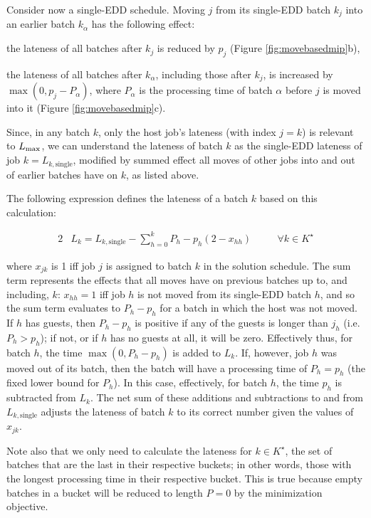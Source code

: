 \documentclass[13pt, letterpaper, oneside]{book}
\begin{document}


Consider now a single-EDD schedule. Moving $j$ from its single-EDD batch $k_j$ into an earlier
batch $k_\alpha$ has the following effect:
\begin{alist}
\item{the lateness of all batches after $k_j$ is reduced by $p_j$ (Figure
\ref{fig:movebasedmip}b),}
\item{the lateness of all batches after $k_\alpha$, including those after $k_j$,
is increased by $\max(0,p_j - P_\alpha)$, where $P_\alpha$ is the processing
time of batch $\alpha$ before $j$ is moved into it (Figure
\ref{fig:movebasedmip}c).}
\end{alist}
Since, in any batch $k$, only the host job's lateness (with index $j = k$) is
relevant to $L_{\text{max}}$, we can understand the lateness of batch $k$ as the
single-EDD lateness of job $k = L_{k,\text{single}}$, modified by summed effect
all moves of other jobs into and out of earlier batches have on $k$, as listed
above.
 
The following expression defines the lateness of a batch $k$ based on this
calculation:
 
\begin{alignat}{2} & L_k = L_{k,\text{single}} - \sum_{h=0}^{k} P_h - p_h(2 -
x_{hh}) \quad && \forall k \in K^\star \end{alignat}
 
where $x_{jk}$ is 1 iff job $j$ is assigned to batch $k$ in the solution
schedule. The sum term represents the effects that all moves have on previous
batches up to, and including, $k$: $x_{hh} = 1$ iff job $h$ is not moved from
its single-EDD batch $h$, and so the sum term evaluates to $P_h - p_h$ for a
batch in which the host was not moved. If $h$ has guests, then $P_h - p_h$ is
positive if any of the guests is longer than $j_h$ (i.e. $P_h > p_h$); if not,
or if $h$ has no guests at all, it will be zero. Effectively thus, for batch
$h$, the time $\max(0, P_h-p_h)$ is added to $L_k$. If, however, job $h$ was
moved out of its batch, then the batch will have a processing time of $P_h =
p_h$ (the fixed lower bound for $P_h$). In this case, effectively, for batch
$h$, the time $p_h$ is subtracted from $L_k$. The net sum of these additions
and subtractions to and from $L_{k,\text{single}}$ adjusts the lateness of
batch $k$ to its correct number given the values of $x_{jk}$. 

Note also that we only need to calculate the lateness for $k \in K^\star$, the set
of batches that are the last in their respective buckets; in other words, those
with the longest processing time in their respective bucket. This is true
because empty batches in a bucket will be reduced to length $P = 0$ by the
minimization objective.
\end{document}
